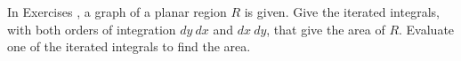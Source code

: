 {\noindent In Exercises}
{, a graph of a planar region $R$ is given. Give the iterated integrals, with both orders of integration $dy\ dx$ and $dx\ dy$, that give the area of $R$. Evaluate one of the iterated integrals to find the area.}
